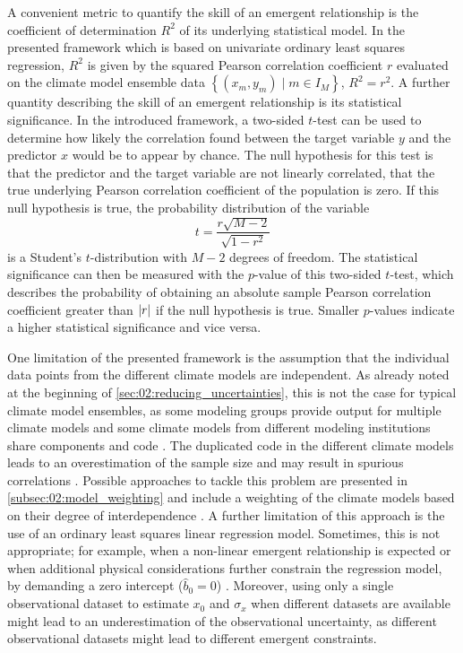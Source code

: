 A convenient metric to quantify the skill of an emergent relationship is the
coefficient of determination $R^2$ of its underlying statistical model. In the
presented framework which is based on univariate ordinary least squares
regression, $R^2$ is given by the squared Pearson correlation coefficient $r$
evaluated on the climate model ensemble data $\left\{ \left( x_m, y_m \right)
\mid m \in I_M \right\}$, \ie{} $R^2 = r^2$. A further quantity describing the
skill of an emergent relationship is its statistical significance. In the
introduced framework, a two-sided $t$-test can be used to determine how likely
the correlation found between the target variable $y$ and the predictor $x$
would be to appear by chance. The null hypothesis for this test is that the
predictor and the target variable are not linearly correlated, \ie{} that the
true underlying Pearson correlation coefficient of the population is zero. If
this null hypothesis is true, the probability distribution of the variable
\begin{equation}
  t = \frac{r \sqrt{M - 2}}{\sqrt{1 - r^2}}
  \label{eq:02:t}
\end{equation}
is a Student's $t$-distribution with $M - 2$ degrees of freedom. The
statistical significance can then be measured with the $p$-value of this
two-sided $t$-test, which describes the probability of obtaining an absolute
sample Pearson correlation coefficient greater than $\abs*{r}$ if the null
hypothesis is true. Smaller $p$-values indicate a higher statistical
significance and vice versa.

One limitation of the presented framework is the assumption that the individual
data points from the different climate models are independent. As already noted
at the beginning of \cref{sec:02:reducing_uncertainties}, this is not the case
for typical climate model ensembles, as some modeling groups provide output for
multiple climate models and some climate models from different modeling
institutions share components and code \autocite{Knutti2013}. The duplicated
code in the different climate models leads to an overestimation of the sample
size and may result in spurious correlations \autocite{Sanderson2015}. Possible
approaches to tackle this problem are presented in
\cref{subsec:02:model_weighting} and include a weighting of the climate models
based on their degree of interdependence \autocite{Knutti2017a, Sanderson2015,
  Sanderson2017}. A further limitation of this approach is the use of an
ordinary least squares linear regression model. Sometimes, this is not
appropriate; for example, when a non-linear emergent relationship is expected
\autocite{Nijsse2020} or when additional physical considerations further
constrain the regression model, \eg{} by demanding a zero intercept ($\hat{b}_0
= 0$) \autocite{Annan2020, JimenezdelaCuesta2019}. Moreover, using only a
single observational dataset to estimate $x_0$ and $\sigma_x$ when different
datasets are available might lead to an underestimation of the observational
uncertainty, as different observational datasets might lead to different
emergent constraints.

